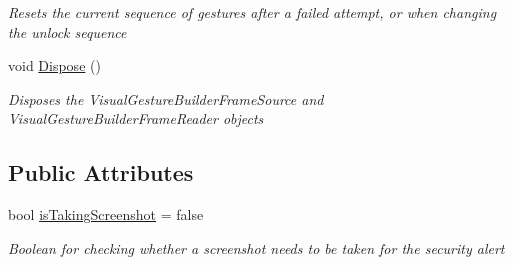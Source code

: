 \begin{DoxyCompactItemize}
\begin{DoxyCompactList}\small\item\em Resets the current sequence of gestures after a failed attempt, or when changing the unlock sequence \end{DoxyCompactList}\item 
void \hyperlink{class_microsoft_1_1_samples_1_1_kinect_1_1_kinect_security_system_1_1_gesture_detector_aec416d9411b2760f932af8135274c4d8}{Dispose} ()
\begin{DoxyCompactList}\small\item\em Disposes the Visual\+Gesture\+Builder\+Frame\+Source and Visual\+Gesture\+Builder\+Frame\+Reader objects \end{DoxyCompactList}\end{DoxyCompactItemize}
\subsection*{Public Attributes}
\begin{DoxyCompactItemize}
\item 
bool \hyperlink{class_microsoft_1_1_samples_1_1_kinect_1_1_kinect_security_system_1_1_gesture_detector_ae7a78de4832f284933db25aaaad77ce4}{is\+Taking\+Screenshot} = false
\begin{DoxyCompactList}\small\item\em Boolean for checking whether a screenshot needs to be taken for the security alert \end{DoxyCompactList}\end{DoxyCompactItemize}
